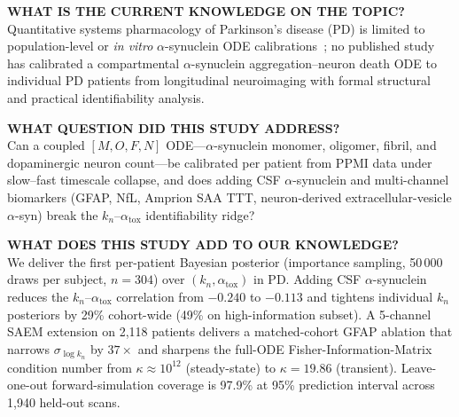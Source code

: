 
\begin{studyhighlights}
\textbf{WHAT IS THE CURRENT KNOWLEDGE ON THE TOPIC?}\\
Quantitative systems pharmacology of Parkinson's disease (PD) is limited to population-level or \textit{in vitro} $\alpha$-synuclein ODE calibrations~\cite{veronneau2020,ivanova2024,righetti2025}; no published study has calibrated a compartmental $\alpha$-synuclein aggregation--neuron death ODE to individual PD patients from longitudinal neuroimaging with formal structural and practical identifiability analysis.

\vspace{0.3em}\textbf{WHAT QUESTION DID THIS STUDY ADDRESS?}\\
Can a coupled $[M,O,F,N]$ ODE---$\alpha$-synuclein monomer, oligomer, fibril, and dopaminergic neuron count---be calibrated per patient from PPMI data under slow--fast timescale collapse, and does adding CSF $\alpha$-synuclein and multi-channel biomarkers (GFAP, NfL, Amprion SAA TTT, neuron-derived extracellular-vesicle $\alpha$-syn) break the $k_n$--$\alpha_\text{tox}$ identifiability ridge?

\vspace{0.3em}\textbf{WHAT DOES THIS STUDY ADD TO OUR KNOWLEDGE?}\\
We deliver the first per-patient Bayesian posterior (importance sampling, 50\,000 draws per subject, $n{=}304$) over $(k_n, \alpha_\text{tox})$ in PD. Adding CSF $\alpha$-synuclein reduces the $k_n$--$\alpha_\text{tox}$ correlation from $-0.240$ to $-0.113$ and tightens individual $k_n$ posteriors by 29\% cohort-wide (49\% on high-information subset). A 5-channel SAEM extension on 2{,}118 patients delivers a matched-cohort GFAP ablation that narrows $\sigma_{\log k_n}$ by $37\times$ and sharpens the full-ODE Fisher-Information-Matrix condition number from $\kappa \approx 10^{12}$ (steady-state) to $\kappa = 19.86$ (transient). Leave-one-out forward-simulation coverage is 97.9\% at 95\% prediction interval across 1{,}940 held-out scans.


\end{studyhighlights}
